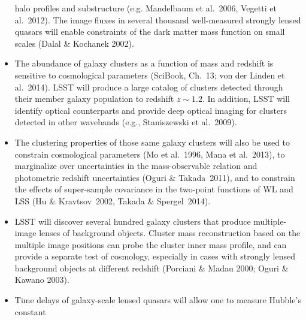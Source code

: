 \begin{itemize}
halo profiles and substructure (e.g. Mandelbaum et al.~2006, Vegetti et al.~2012). The image fluxes in several thousand well-measured
strongly lensed quasars will enable constraints of the dark matter mass function on small scales (Dalal \& Kochanek 2002).
\item The abundance of galaxy clusters as a function of mass and redshift is sensitive to cosmological parameters
(SciBook, Ch.~13; von der Linden et al.~2014). LSST will produce a large catalog of clusters detected through their member galaxy population
to redshift $z\sim 1.2$.  In addition, LSST will identify optical counterparts and provide deep optical
imaging for clusters detected in other wavebands (e.g., Staniszewski et al.~2009).
\item The clustering properties of those same galaxy clusters will also be used to constrain
  cosmological parameters (Mo et al.~1996, Mana et al.~2013), to marginalize over uncertainties in
  the mass-observable relation and photometric redshift uncertainties (Oguri \& Takada~2011), and to constrain the effects of super-sample covariance in the two-point functions of WL and LSS (Hu \& Kravtsov~2002, Takada \& Spergel~2014).
\item LSST will discover several hundred galaxy clusters that produce multiple-image lenses of background objects.
Cluster mass reconstruction based on the multiple image positions
 can probe the cluster inner mass profile, and can provide a separate test of cosmology, especially
in cases with strongly lensed background objects at different redshift (Porciani \& Madau 2000; Oguri \& Kawano 2003).
\item Time delays of galaxy-scale lensed quasars will allow one to measure Hubble's constant

\end{itemize}

